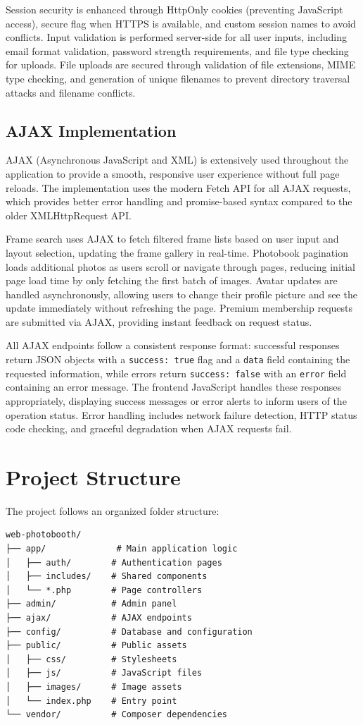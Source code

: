 \documentclass[12pt,a4paper]{article}
\begin{document}
Session security is enhanced through HttpOnly cookies (preventing JavaScript access), secure flag when HTTPS is available, and custom session names to avoid conflicts. Input validation is performed server-side for all user inputs, including email format validation, password strength requirements, and file type checking for uploads. File uploads are secured through validation of file extensions, MIME type checking, and generation of unique filenames to prevent directory traversal attacks and filename conflicts.

\subsection{AJAX Implementation}
AJAX (Asynchronous JavaScript and XML) is extensively used throughout the application to provide a smooth, responsive user experience without full page reloads. The implementation uses the modern Fetch API for all AJAX requests, which provides better error handling and promise-based syntax compared to the older XMLHttpRequest API.

Frame search uses AJAX to fetch filtered frame lists based on user input and layout selection, updating the frame gallery in real-time. Photobook pagination loads additional photos as users scroll or navigate through pages, reducing initial page load time by only fetching the first batch of images. Avatar updates are handled asynchronously, allowing users to change their profile picture and see the update immediately without refreshing the page. Premium membership requests are submitted via AJAX, providing instant feedback on request status.

All AJAX endpoints follow a consistent response format: successful responses return JSON objects with a \texttt{success: true} flag and a \texttt{data} field containing the requested information, while errors return \texttt{success: false} with an \texttt{error} field containing an error message. The frontend JavaScript handles these responses appropriately, displaying success messages or error alerts to inform users of the operation status. Error handling includes network failure detection, HTTP status code checking, and graceful degradation when AJAX requests fail.

\section{Project Structure}

The project follows an organized folder structure:
\begin{lstlisting}
web-photobooth/
├── app/              # Main application logic
│   ├── auth/        # Authentication pages
│   ├── includes/    # Shared components
│   └── *.php        # Page controllers
├── admin/           # Admin panel
├── ajax/            # AJAX endpoints
├── config/          # Database and configuration
├── public/          # Public assets
│   ├── css/         # Stylesheets
│   ├── js/          # JavaScript files
│   ├── images/      # Image assets
│   └── index.php    # Entry point
└── vendor/          # Composer dependencies
\end{lstlisting}
\end{document}
